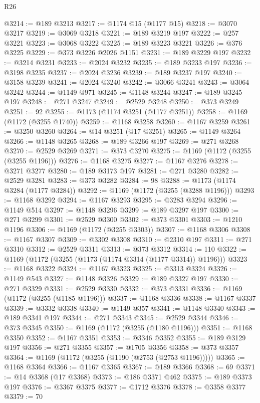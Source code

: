 \begin{lexlean}{R26}
\begin{coremodule}
@3214 := @189 @3213
@3217 := @1174 @15 (@1177 @15)
@3218 := @3070 @3217
@3219 := @3069 @3218
@3221 := @189 @3219 @197
@3222 := @257 @3221
@3223 := @3068 @3222
@3225 := @189 @3223 @3221
@3226 := @376 @3225
@3229 := @373 @3226 @2026 @1151
@3231 := @189 @3229 @197
@3232 := @3214 @3231
@3233 := @2024 @3232
@3235 := @189 @3233 @197
@3236 := @3198 @3235
@3237 := @2024 @3236
@3239 := @189 @3237 @197
@3240 := @3158 @3239
@3241 := @2024 @3240
@3242 := @3066 @3241
@3243 := @3064 @3242
@3244 := @1149 @971
@3245 := @1148 @3244
@3247 := @189 @3245 @197
@3248 := @271 @3247
@3249 := @2529 @3248
@3250 := @373 @3249
@3251 := 92
@3255 := @1173 (@1174 @3251 (@1177 @3251))
@3258 := @1169 (@1172 (@3255 @1740))
@3259 := @1168 @3258
@3260 := @1167 @3259
@3261 := @3250 @3260
@3264 := @14 @3251 (@17 @3251)
@3265 := @1149 @3264
@3266 := @1148 @3265
@3268 := @189 @3266 @197
@3269 := @271 @3268
@3270 := @2529 @3269
@3271 := @373 @3270
@3275 := @1169 (@1172 (@3255 (@3255 @1196)))
@3276 := @1168 @3275
@3277 := @1167 @3276
@3278 := @3271 @3277
@3280 := @189 @3173 @197
@3281 := @271 @3280
@3282 := @2529 @3281
@3283 := @373 @3282
@3284 := 98
@3288 := @1173 (@1174 @3284 (@1177 @3284))
@3292 := @1169 (@1172 (@3255 (@3288 @1196)))
@3293 := @1168 @3292
@3294 := @1167 @3293
@3295 := @3283 @3294
@3296 := @1149 @514
@3297 := @1148 @3296
@3299 := @189 @3297 @197
@3300 := @271 @3299
@3301 := @2529 @3300
@3302 := @373 @3301
@3303 := @1210 @1196
@3306 := @1169 (@1172 (@3255 @3303))
@3307 := @1168 @3306
@3308 := @1167 @3307
@3309 := @3302 @3308
@3310 := @2310 @197
@3311 := @271 @3310
@3312 := @2529 @3311
@3313 := @373 @3312
@3314 := 110
@3322 := @1169 (@1172 (@3255 (@1173 (@1174 @3314 (@1177 @3314)) @1196)))
@3323 := @1168 @3322
@3324 := @1167 @3323
@3325 := @3313 @3324
@3326 := @1149 @543
@3327 := @1148 @3326
@3329 := @189 @3327 @197
@3330 := @271 @3329
@3331 := @2529 @3330
@3332 := @373 @3331
@3336 := @1169 (@1172 (@3255 (@1185 @1196)))
@3337 := @1168 @3336
@3338 := @1167 @3337
@3339 := @3332 @3338
@3340 := @1149 @357
@3341 := @1148 @3340
@3343 := @189 @3341 @197
@3344 := @271 @3343
@3345 := @2529 @3344
@3346 := @373 @3345
@3350 := @1169 (@1172 (@3255 (@1180 @1196)))
@3351 := @1168 @3350
@3352 := @1167 @3351
@3353 := @3346 @3352
@3355 := @189 @3129 @197
@3356 := @271 @3355
@3357 := @1705 @3356
@3358 := @373 @3357
@3364 := @1169 (@1172 (@3255 (@1190 (@2753 (@2753 @1196)))))
@3365 := @1168 @3364
@3366 := @1167 @3365
@3367 := @189 @3366
@3368 := 69
@3371 := @14 @3368 (@17 @3368)
@3373 := @186 @3371 @462
@3375 := @189 @3373 @197
@3376 := @3367 @3375
@3377 := @1712 @3376
@3378 := @3358 @3377
@3379 := 70

\end{coremodule}
\end{lexlean}
